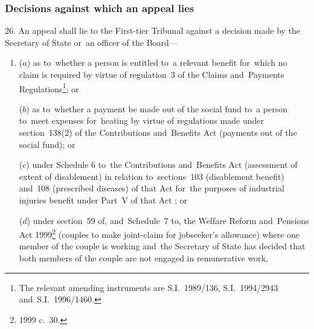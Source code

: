 \documentclass[12pt,a4paper]{article}
\begin{document}
\subsubsection[26. Decisions against which an appeal lies]{Decisions against which an appeal lies}

26.  An appeal shall lie to
the First-tier Tribunal  %
against a decision made by the Secretary of State
or~an officer of the Board—  %
\begin{enumerate}\item[]
($a$) as to~whether a person is entitled to~a relevant benefit for~which no claim is required by virtue of regulation~3 of the Claims and~Payments Regulations\footnote{\frenchspacing The relevant amending instruments are S.I.~1989/136, S.I.~1994/2943 and~S.I.~1996/1460.}; or

($b$) as to~whether a payment be made out of the social fund to~a person to~meet expenses for~heating by virtue of regulations made under section~138(2) of the Contributions and~Benefits Act (payments out of the social fund);
or

($c$) under Schedule 6 to~the Contributions and~Benefits Act (assessment of extent of disablement) in relation to~sections~103 (disablement benefit) and~108 (prescribed diseases) of that Act for~the purposes of industrial injuries benefit under Part~V of that Act%
; or

    ($d$) 
    under section~59 of, and~Schedule~7 to, the Welfare Reform and~Pensions Act 1999\footnote{1999 c.~30.} (couples to make joint-claim for jobseeker’s allowance) where one member of the couple is working and~the Secretary of State has decided that both members of the couple are not engaged in remunerative work,
\end{enumerate}

\end{document}
